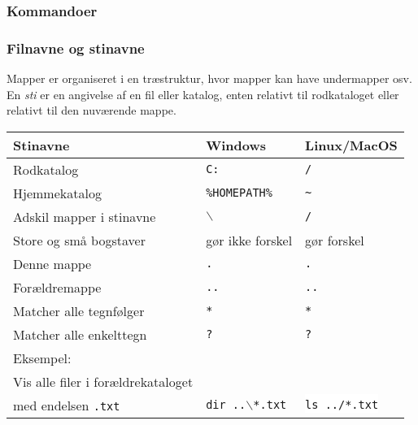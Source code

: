 \documentclass{beamer}
\begin{document}
\begin{frame}
\frametitle{Kommandoer}


\end{frame}

\begin{frame}
\frametitle{Filnavne og stinavne}

Mapper er organiseret i en træstruktur, hvor mapper kan have
undermapper osv.  En \emph{sti} er en angivelse af en fil eller
katalog, enten relativt til rodkataloget eller relativt til den
nuværende mappe.

\vspace{2ex}

\begin{tabular}{l|l@{\quad\quad}l}
\textbf{Stinavne} & \textbf{Windows} & \textbf{Linux/MacOS} \\\hline
Rodkatalog & \texttt{C:} & \texttt{/} \\
Hjemmekatalog & \texttt{\%HOMEPATH\%} & \texttt{\~{}} \\
Adskil mapper i stinavne & \texttt{$\backslash$} & \texttt{/} \\
Store og små bogstaver & gør ikke forskel & gør forskel \\
Denne mappe & \texttt{.} &  \texttt{.} \\
Forældremappe & \texttt{..} &  \texttt{..} \\
Matcher alle tegnfølger & \texttt{*} &  \texttt{*} \\
Matcher alle enkelttegn & \texttt{?} &  \texttt{?} \\[1ex]
Eksempel:\\
Vis alle filer i forældrekataloget \\
med endelsen \texttt{.txt}
& \texttt{dir ..$\backslash$*.txt} & \colorbox{white}{\texttt{ls ../*.txt}}
\end{tabular}

\end{frame}
\end{document}
